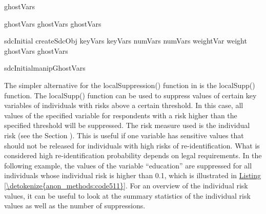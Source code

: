 \documentclass[letterpaper,10pt,english]{sphinxmanual}
\begin{document}
\def\sphinxLiteralBlockLabel{\label{\detokenize{anon_methods:code510}}}
%
\begin{sphinxVerbatim}[commandchars=\\\{\},numbers=left,firstnumber=1,stepnumber=1]
 ghostVars  

 ghostVars\PYG{p}{[[}\PYG{p}{]]}  
 ghostVars\PYG{p}{[[}\PYG{p}{]]}\PYG{p}{[[}\PYG{p}{]]}  
 ghostVars\PYG{p}{[[}\PYG{p}{]]}\PYG{p}{[[}\PYG{p}{]]}  

 sdcInitial  createSdcObj keyVars  keyVars numVars  numVars
                            weightVar  weight ghostVars  ghostVars

 sdcInitialmanipGhostVars
\end{sphinxVerbatim}

The simpler alternative for the localSuppression() function in
 is the localSupp() function. The localSupp() function can be
used to suppress values of certain key variables of individuals with
risks above a certain threshold. In this case, all values of the
specified variable for respondents with a risk higher than the specified
threshold will be suppressed. The risk measure used is the individual
risk (see the Section ).
This is useful if one variable has sensitive
values that should not be released for individuals with high risks of
re-identification. What is considered high re-identification probability
depends on legal requirements. In the following example, the values of
the variable “education” are suppressed for all individuals whose
individual risk is higher than 0.1, which is illustrated in \hyperref[\detokenize{anon_methods:code511}]{Listing \ref{\detokenize{anon_methods:code511}}}.
For an overview of the individual risk values, it can be useful to
look at the summary statistics of the individual risk values as well as
the number of suppressions.
\end{document}
